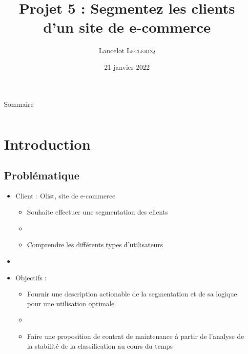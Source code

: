 \documentclass[8pt,aspectratio=169,hyperref={unicode=true}]{beamer}
\title[Segmentez les clients d'un site de e-commerce]
{Projet 5 : Segmentez les clients d'un site de e-commerce}
\author[Lancelot \textsc{Leclercq}]{Lancelot \textsc{Leclercq}}
\institute[]{}
\date[]{\small{21 janvier 2022}}
\begin{document}
\begin{frame}[plain]
    \titlepage
\end{frame}

\begin{frame}{Sommaire}
    \Large
    \begin{columns}
        \begin{column}{.7\textwidth}
            \tableofcontents[hideallsubsections]
        \end{column}
    \end{columns}
\end{frame}


\section{Introduction}
\subsection{Problématique}
\begin{frame}{\insertsubsection}
    \begin{itemize}
        \item Client : Olist, site de e-commerce
              \begin{itemize}
                  \item Souhaite effectuer une segmentation des clients
                  \item[]
                  \item Comprendre les différents types d'utilisateurs
              \end{itemize}
        \item[]
        \item Objectifs :
              \begin{itemize}
                  \item Fournir une description actionable de la segmentation et de sa logique pour une utilisation optimale
                  \item[]
                  \item Faire une proposition de contrat de maintenance à partir de l'analyse de la stabilité de la classification au cours du temps
              \end{itemize}
    \end{itemize}
\end{frame}
\end{document}
